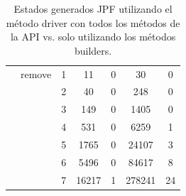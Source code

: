 \begin{table}[!thb]
\begin{tabular}{ c| l| c c c c c}
\cline{2-7}

& remove
  & 1 & 11  & 0 & 30  & 0 \\
& & 2 & 40  & 0 & 248 & 0 \\
& & 3 & 149 & 0 & 1405  & 0 \\
& & 4 & 531 & 0 & 6259  & 1 \\
& & 5 & 1765  & 0 & 24107 & 3 \\
& & 6 & 5496  & 0 & 84617 & 8 \\
& & 7 & 16217 & 1 & 278241  & 24  \\

\hline

\end{tabular}%
\caption{Estados generados JPF utilizando el método driver con todos los métodos de la API vs. solo utilizando los métodos builders.}
\label{tab:results2-jpf}
 
\end{table}













